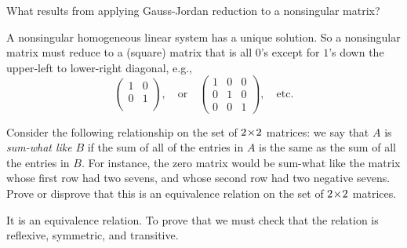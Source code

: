 \begin{exercises}
\begin{answer}
\begin{exparts}
      \end{exparts}  
    \end{answer}
  \recommended \item  
    What results from applying Gauss-Jordan reduction to a
    nonsingular matrix?
    \begin{answer}
      A nonsingular homogeneous linear system has a unique solution.
      So a nonsingular matrix must reduce to a (square) 
      matrix that is all \( 0 \)'s
      except for \( 1 \)'s down the upper-left to lower-right diagonal, e.g.,
      \begin{equation*}
         \begin{pmatrix}
           1  &0  \\
           0  &1  \\
         \end{pmatrix},
         \quad\text{or}\quad
         \begin{pmatrix}
           1  &0  &0  \\
           0  &1  &0  \\
           0  &0  &1
         \end{pmatrix},
         \quad\text{etc.}
      \end{equation*}  
    \end{answer}
 \item \cite{Cleary}
    Consider the following relationship on the set of $2 \! \times \! 2$ matrices:  
    we say that $A$ is \textit{sum-what like} $B$ if the sum of all of 
    the entries in $A$ is the same as the sum of all the entries in $B$.  
    For instance, the zero matrix would be sum-what like the matrix 
    whose first row had two sevens, and whose second row had two 
    negative sevens.
    Prove or disprove that this is an equivalence relation on the set 
    of $2 \! \times \! 2$ matrices.
    \begin{answer}
      It is an equivalence relation.
      To prove that we must check that the relation 
      is reflexive, symmetric, and transitive.


\end{answer}
\end{exercises}
